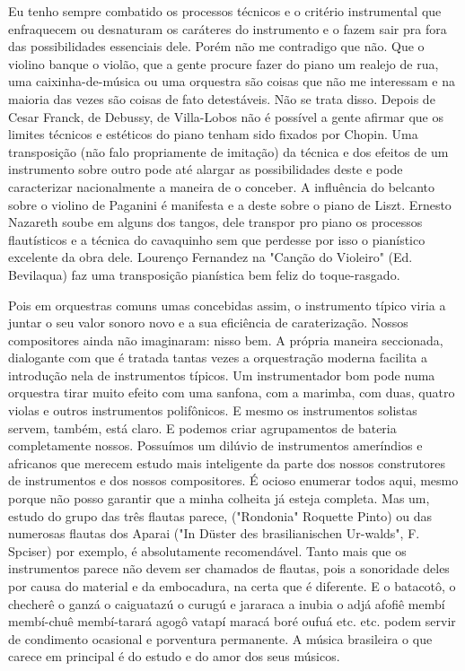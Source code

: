 Eu tenho sempre combatido os processos técnicos e o critério
instrumental que enfraquecem ou desnaturam os caráteres do instrumento e
o fazem sair pra fora das possibilidades essenciais dele. Porém não me
contradigo que não. Que o violino banque o violão, que a gente procure
fazer do piano um realejo de rua, uma caixinha-de-música ou uma
orquestra são coisas que não me interessam e na maioria das vezes são
coisas de fato detestáveis. Não se trata disso. Depois de Cesar Franck,
de Debussy, de Villa-Lobos não é possível a gente afirmar que os limites
técnicos e estéticos do piano tenham sido fixados por Chopin. Uma
transposição (não falo propriamente de imitação) da técnica e dos
efeitos de um instrumento sobre outro pode até alargar as possibilidades
deste e pode caracterizar nacionalmente a maneira de o conceber. A
influência do belcanto sobre o violino de Paganini é manifesta e a deste
sobre o piano de Liszt. Ernesto Nazareth soube em alguns dos tangos,
dele transpor pro piano os processos flautísticos e a técnica do
cavaquinho sem que perdesse por isso o pianístico excelente da obra
dele. Lourenço Fernandez na "Canção do Violeiro" (Ed. Bevilaqua) faz uma
transposição pianística bem feliz do toque-rasgado.

Pois em orquestras comuns umas concebidas assim, o instrumento típico
viria a juntar o seu valor sonoro novo e a sua eficiência de
caraterização. Nossos compositores ainda não imaginaram: nisso bem. A
própria maneira seccionada, dialogante com que é tratada tantas vezes a
orquestração moderna facilita a introdução nela de instrumentos típicos.
Um instrumentador bom pode numa orquestra tirar muito efeito com uma
sanfona, com a marimba, com duas, quatro violas e outros instrumentos
polifônicos. E mesmo os instrumentos solistas servem, também, está
claro. E podemos criar agrupamentos de bateria completamente nossos.
Possuímos um dilúvio de instrumentos ameríndios e africanos que merecem
estudo mais inteligente da parte dos nossos construtores de instrumentos
e dos nossos compositores. É ocioso enumerar todos aqui, mesmo porque
não posso garantir que a minha colheita já esteja completa. Mas um,
estudo do grupo das três flautas parece, ("Rondonia" Roquette Pinto) ou
das numerosas flautas dos Aparai ("In Düster des brasilianischen
Ur-walds", F. Spciser) por exemplo, é absolutamente recomendável. Tanto
mais que os instrumentos parece não devem ser chamados de flautas, pois
a sonoridade deles por causa do material e da embocadura, na certa que é
diferente. E o batacotô, o checherê o ganzá o caiguatazú o curugú e
jararaca a inubia o adjá afofiê membí membí-chuê membí-tarará agogô
vatapí maracá boré oufuá etc. etc. podem servir de condimento ocasional
e porventura permanente. A música brasileira o que carece em principal é
do estudo e do amor dos seus músicos.

